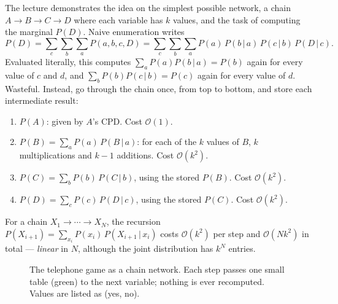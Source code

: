 \documentclass[11pt, oneside]{book}
\newcommand{\Prob}{\mathbb{P}}           %
\newcommand{\bigO}[1]{\mathcal{O}\!\left(#1\right)}
\newcommand{\given}{\,\vert\,}           %
\begin{document}
The lecture demonstrates the idea on the simplest possible network, a chain
$A \to B \to C \to D$ where each variable has $k$ values, and the task of
computing the marginal $P(D)$. Naive enumeration writes
\[
P(D) = \sum_{c}\sum_{b}\sum_{a} P(a, b, c, D)
     = \sum_{c}\sum_{b}\sum_{a} P(a)\, P(b \given a)\, P(c \given b)\, P(D \given c).
\]
Evaluated literally, this computes $\sum_a P(a) P(b \given a) = P(b)$ again
for every value of $c$ and $d$, and $\sum_b P(b) P(c \given b) = P(c)$ again
for every value of $d$. Wasteful. Instead, go through the chain once, from
top to bottom, and store each intermediate result:
\begin{enumerate}
  \item $P(A)$: given by $A$'s CPD. Cost $\bigO{1}$.
  \item $P(B) = \sum_{a} P(a)\, P(B \given a)$: for each of the $k$ values of
    $B$, $k$ multiplications and $k-1$ additions. Cost $\bigO{k^2}$.
  \item $P(C) = \sum_{b} P(b)\, P(C \given b)$, using the stored $P(B)$.
    Cost $\bigO{k^2}$.
  \item $P(D) = \sum_{c} P(c)\, P(D \given c)$, using the stored $P(C)$.
    Cost $\bigO{k^2}$.
\end{enumerate}
For a chain $X_1 \to \cdots \to X_N$, the recursion $P(X_{i+1}) = \sum_{x_i}
P(x_i)\, P(X_{i+1} \given x_i)$ costs $\bigO{k^2}$ per step and
$\bigO{N k^2}$ in total --- \emph{linear} in $N$, although the joint
distribution has $k^N$ entries.

\begin{figure}[htbp]
\centering
{}
\caption{The telephone game as a chain network. Each step passes one small
table (green) to the next variable; nothing is ever recomputed. Values are
listed as (yes, no).}
\label{fig:telephone}
\end{figure}
\end{document}
